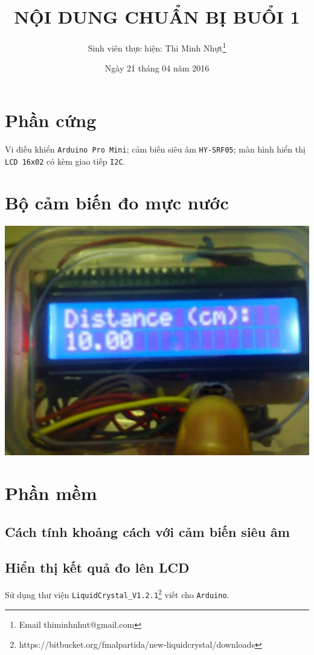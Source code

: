 \documentclass[13pt,a4paper]{extarticle}
\begin{document}
\title{\textbf{NỘI DUNG CHUẨN BỊ BUỔI 1}}
\author{Sinh viên thực hiện: Thi Minh Nhựt\thanks{\textsf{Email thiminhnhut@gmail.com}}}
\date{Ngày 21 tháng 04 năm 2016}
\maketitle
\section{Phần cứng}
Vi điều khiển \verb|Arduino Pro Mini|; cảm biến siêu âm \verb|HY-SRF05|; màn hình hiển thị \verb|LCD 16x02| có kèm giao tiếp \verb|I2C|.
\section{Bộ cảm biến đo mực nước}
\begin{center}
\includegraphics[scale=.3]{do-muc-nuoc-voi-cam-bien-sieu-am}
\end{center}
\section{Phần mềm}
\subsection{Cách tính khoảng cách với cảm biến siêu âm}

\subsection{Hiển thị kết quả đo lên LCD}
Sử dụng thư viện \verb|LiquidCrystal_V1.2.1|\footnote{\textsf{https://bitbucket.org/fmalpartida/new-liquidcrystal/downloads}} viết cho \verb|Arduino|.
\end{document}
